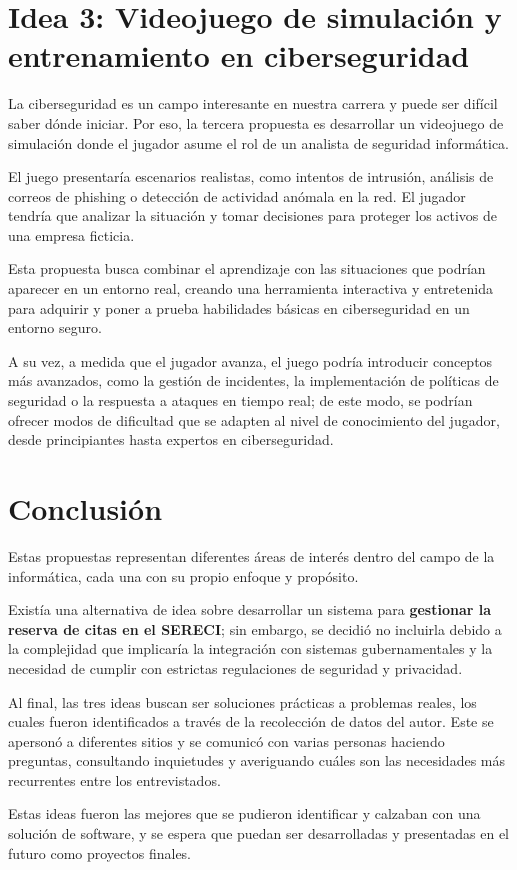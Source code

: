 \documentclass[12pt]{article}
\begin{document}
\section*{Idea 3: Videojuego de simulación y entrenamiento en ciberseguridad}

La ciberseguridad es un campo interesante en nuestra carrera y puede ser difícil saber dónde iniciar.
Por eso, la tercera propuesta es desarrollar un videojuego de simulación donde el jugador asume el rol de un analista de seguridad informática.

El juego presentaría escenarios realistas, como intentos de intrusión, análisis de correos de phishing o detección de actividad anómala en la red. El jugador tendría que analizar la situación y tomar decisiones para proteger los activos de una empresa ficticia.

Esta propuesta busca combinar el aprendizaje con las situaciones que podrían aparecer en un entorno real, creando una herramienta interactiva y entretenida para adquirir y poner a prueba habilidades básicas en ciberseguridad en un entorno seguro.

A su vez, a medida que el jugador avanza, el juego podría introducir conceptos más avanzados, como la gestión de incidentes, la implementación de políticas de seguridad o la respuesta a ataques en tiempo real; de este modo, se podrían ofrecer modos de dificultad que se adapten al nivel de conocimiento del jugador, desde principiantes hasta expertos en ciberseguridad.

\section*{Conclusión}

Estas propuestas representan diferentes áreas de interés dentro del campo de la informática, cada una con su propio enfoque y propósito.

Existía una alternativa de idea sobre desarrollar un sistema para \textbf{gestionar la reserva de citas en el SERECI}; sin embargo, se decidió no incluirla debido a la complejidad que implicaría la integración con sistemas gubernamentales y la necesidad de cumplir con estrictas regulaciones de seguridad y privacidad.

Al final, las tres ideas buscan ser soluciones prácticas a problemas reales, los cuales fueron identificados a través de la recolección de datos del autor. Este se apersonó a diferentes sitios y se comunicó con varias personas haciendo preguntas, consultando inquietudes y averiguando cuáles son las necesidades más recurrentes entre los entrevistados.

Estas ideas fueron las mejores que se pudieron identificar y calzaban con una solución de software, y se espera que puedan ser desarrolladas y presentadas en el futuro como proyectos finales.
\end{document}
